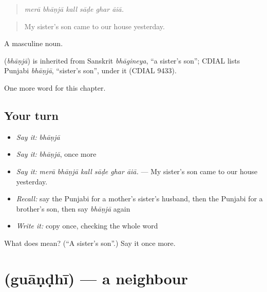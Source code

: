 \begin{quote}
     
\end{quote}

\begin{quote}
\emph{merā bhāṇjā kall sāḍe ghar āiā.}
\end{quote}

\begin{quote}
My sister's son came to our house yesterday.
\end{quote}

A masculine noun.

\begin{cousinweb}
\textbf{} (\emph{bhāṇjā}) is inherited from Sanskrit \emph{bhāgineya}, \textquotedblleft{}a sister's son\textquotedblright{}; CDIAL lists Punjabi \emph{bhāṇjā}, \textquotedblleft{}sister's son\textquotedblright{}, under it (CDIAL 9433).
\end{cousinweb}

\begin{grammarlens}[title={What you've built}]
One more word for this chapter.
\end{grammarlens}

\subsection*{Your turn}
\begin{itemize}
\raggedright
  \item \emph{Say it:} \emph{bhāṇjā}
  \item \emph{Say it:} \emph{bhāṇjā}, once more
  \item \emph{Say it:} \emph{merā bhāṇjā kall sāḍe ghar āiā.} — My sister's son came to our house yesterday.
  \item \emph{Recall:} say the Punjabi for a mother's sister's husband, then the Punjabi for a brother's son, then say \emph{bhāṇjā} again
  \item \emph{Write it:} copy \textbf{} once, checking the whole word
\end{itemize}

\begin{tcolorbox}[breakable,colback=teal!4,colframe=teal!35!black,title={Before you move on}]
What does  mean? (\textquotedblleft{}A sister's son\textquotedblright{}.) Say it once more.
\end{tcolorbox}
\section[\texorpdfstring{\pa{ਗੁਆਂਢੀ} (guāṇḍhī)}{ਗੁਆਂਢੀ (guāṇḍhī)}]{ (guāṇḍhī) — a neighbour}

